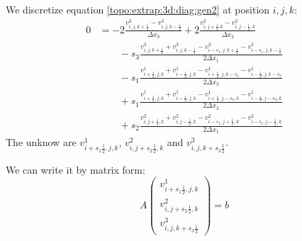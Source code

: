 We discretize equation \ref{topo:extrap:3d:diag:gen2} at position $i,j,k$:
\begin{equation}\label{extrap:3d:3:eq2}
\begin{split}
	0&=-2\frac{v^{3}_{i,j,k+\frac{1}{2}}-v^{3}_{i,j,k-\frac{1}{2}}}{\Delta x_3}+2\frac{v^{2}_{i,j+\frac{1}{2}.k}-v^{2}_{i,j-\frac{1}{2},k}}{\Delta x_2}\\
	&\qquad -s_3\frac{v^{3}_{i,j,k+\frac{1}{2}}+v^{3}_{i,j,k-\frac{1}{2}}-v^{3}_{i-s_1,j,k+\frac{1}{2}}-v^{3}_{i-s_1,j,k-\frac{1}{2}}}{2\Delta x_1}\\
	&\qquad -s_1\frac{v^{1}_{i+\frac{1}{2},j,k}+v^1_{i-\frac{1}{2},j,k}-v^{1}_{i+\frac{1}{2},j,k-s_3}-v^{1}_{i-\frac{1}{2},j,k-s_3}}{2\Delta x_3}\\
	&\qquad +s_1\frac{v^{1}_{i+\frac{1}{2},j,k}+v^{1}_{i-\frac{1}{2},j,k}-v^{1}_{i+\frac{1}{2},j-s_2,k}-v^{1}_{i-\frac{1}{2},j-s_2,k}}{2\Delta x_2}\\
	&\qquad +s_2\frac{v^{2}_{i,j+\frac{1}{2},k}+v^2_{i,j-\frac{1}{2},k}-v^{2}_{i-s_1,j+\frac{1}{2},k}-v^{2}_{i-s_1,j-\frac{1}{2},k}}{2\Delta x_1}
\end{split}
	\end{equation}
The unknow are $v^{1}_{i+s_1\frac{1}{2},j,k}$, $v^2_{i,j+s_2\frac{1}{2},k}$ and $v^{3}_{i,j,k+s_3\frac{1}{2}}$.

We can write it by matrix form:
\begin{equation}
 A\begin{pmatrix}
   v^{1}_{i+s_1\frac{1}{2},j,k}\\
   v^2_{i,j+s_2\frac{1}{2},k}\\
   v^{3}_{i,j,k+s_3\frac{1}{2}}
  \end{pmatrix}=b
\end{equation}

